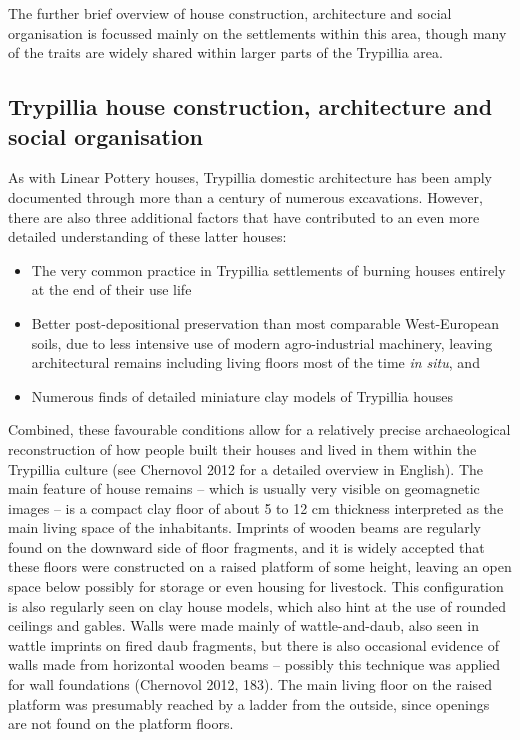 \documentclass[
  12pt,
  a4paper, twoside]{book}
\begin{document}
The further brief overview of house construction, architecture and social organisation is focussed mainly on the settlements within this area, though many of the traits are widely shared within larger parts of the Trypillia area.

\hypertarget{trypillia-house-construction-architecture-and-social-organisation}{%
\subsection{Trypillia house construction, architecture and social organisation}\label{trypillia-house-construction-architecture-and-social-organisation}}

As with Linear Pottery houses, Trypillia domestic architecture has been amply documented through more than a century of numerous excavations. However, there are also three additional factors that have contributed to an even more detailed understanding of these latter houses:

\begin{itemize}
\item
  The very common practice in Trypillia settlements of burning houses entirely at the end of their use life
\item
  Better post-depositional preservation than most comparable West-European soils, due to less intensive use of modern agro-industrial machinery, leaving architectural remains including living floors most of the time \emph{in situ}, and
\item
  Numerous finds of detailed miniature clay models of Trypillia houses
\end{itemize}

Combined, these favourable conditions allow for a relatively precise archaeological reconstruction of how people built their houses and lived in them within the Trypillia culture (see Chernovol 2012 for a detailed overview in English). The main feature of house remains -- which is usually very visible on geomagnetic images -- is a compact clay floor of about 5 to 12 cm thickness interpreted as the main living space of the inhabitants. Imprints of wooden beams are regularly found on the downward side of floor fragments, and it is widely accepted that these floors were constructed on a raised platform of some height, leaving an open space below possibly for storage or even housing for livestock. This configuration is also regularly seen on clay house models, which also hint at the use of rounded ceilings and gables. Walls were made mainly of wattle-and-daub, also seen in wattle imprints on fired daub fragments, but there is also occasional evidence of walls made from horizontal wooden beams -- possibly this technique was applied for wall foundations (Chernovol 2012, 183). The main living floor on the raised platform was presumably reached by a ladder from the outside, since openings are not found on the platform floors.
\end{document}
